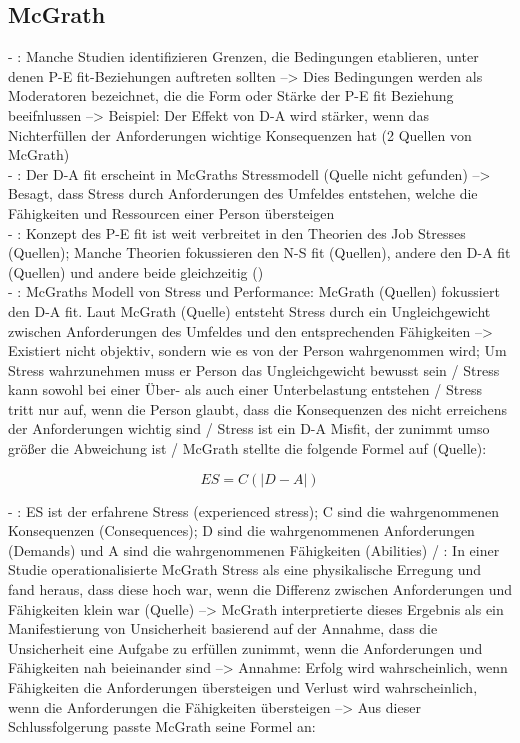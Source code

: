 \subsection{McGrath}
\label{ch:notizen:jobStress:mcgrath}
- \cite[S. 6]{edwards:2008}: Manche Studien identifizieren Grenzen, die Bedingungen etablieren, unter denen P-E fit-Beziehungen auftreten sollten --> Dies Bedingungen werden als Moderatoren bezeichnet, die die Form oder Stärke der P-E fit Beziehung beeifnlussen --> Beispiel: Der Effekt von D-A wird stärker, wenn das Nichterfüllen der Anforderungen wichtige Konsequenzen hat (2 Quellen von McGrath)\\
- \cite[S. 2f.]{edwards:1990}: Der D-A fit erscheint in McGraths Stressmodell (Quelle nicht gefunden) --> Besagt, dass Stress durch Anforderungen des Umfeldes entstehen, welche die Fähigkeiten und Ressourcen einer Person übersteigen \\
- \cite[S. 16]{edwards:2008}: Konzept des P-E fit ist weit verbreitet in den Theorien des Job Stresses (Quellen); Manche Theorien fokussieren den N-S fit (Quellen), andere den D-A fit (Quellen) und andere beide gleichzeitig (\cite{mechanismsOfJobStressAndStrain:1982}) \\
- \cite[S. 16]{edwards:2008}: McGraths Modell von Stress und Performance: McGrath (Quellen) fokussiert den D-A fit. Laut McGrath (Quelle) entsteht Stress durch ein Ungleichgewicht zwischen Anforderungen des Umfeldes und den entsprechenden Fähigkeiten --> Existiert nicht objektiv, sondern wie es von der Person wahrgenommen wird; Um Stress wahrzunehmen muss er Person das Ungleichgewicht bewusst sein / Stress kann sowohl bei einer Über- als auch einer Unterbelastung entstehen / Stress tritt nur auf, wenn die Person glaubt, dass die Konsequenzen des nicht erreichens der Anforderungen wichtig sind / Stress ist ein D-A Misfit, der zunimmt umso größer die Abweichung ist / McGrath stellte die folgende Formel auf (Quelle):

\begin{equation}
	ES = C(|D-A|)
	\label{fig:formel2}
\end{equation}

- \cite[S. 16]{edwards:2008}: ES ist der erfahrene Stress (experienced stress); C sind die wahrgenommenen Konsequenzen (Consequences); D sind die wahrgenommenen Anforderungen (Demands) und A sind die wahrgenommenen Fähigkeiten (Abilities) / \cite[S. 17]{edwards:2008}: In einer Studie operationalisierte McGrath Stress als eine physikalische Erregung und fand heraus, dass diese hoch war, wenn die Differenz zwischen Anforderungen und Fähigkeiten klein war (Quelle) --> McGrath interpretierte dieses Ergebnis als ein Manifestierung von Unsicherheit basierend auf der Annahme, dass die Unsicherheit eine Aufgabe zu erfüllen zunimmt, wenn die Anforderungen und Fähigkeiten nah beieinander sind --> Annahme: Erfolg wird wahrscheinlich, wenn Fähigkeiten die Anforderungen übersteigen und Verlust wird wahrscheinlich, wenn die Anforderungen die Fähigkeiten übersteigen --> Aus dieser Schlussfolgerung passte McGrath seine Formel an:

